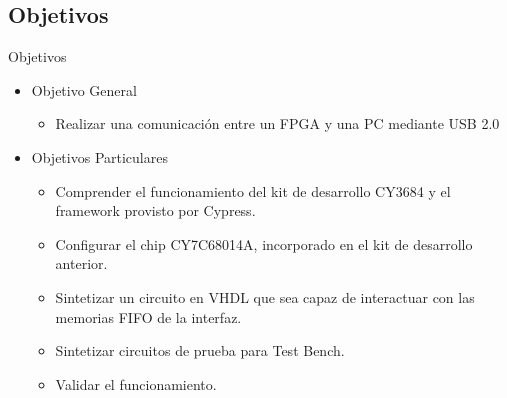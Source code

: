 \documentclass[11pt,a4paper]{beamer}
\begin{document}
		\subsection{Objetivos}
			\begin{frame}{Objetivos}
				\begin{itemize}
					\item Objetivo General
					\begin{itemize}
						\item Realizar una comunicación entre un FPGA y una PC mediante USB 2.0
					\end{itemize}
					\item Objetivos Particulares
					\begin{itemize}
						\item Comprender el funcionamiento del kit de desarrollo CY3684 y el framework provisto por Cypress.
						\item Configurar el chip CY7C68014A, incorporado en el kit de desarrollo anterior.
						\item Sintetizar un circuito en VHDL que sea capaz de interactuar con las memorias FIFO de la interfaz.
						\item Sintetizar circuitos de prueba para Test Bench.
						\item Validar el funcionamiento.
					\end{itemize}
				\end{itemize}
			\end{frame}
\end{document}
